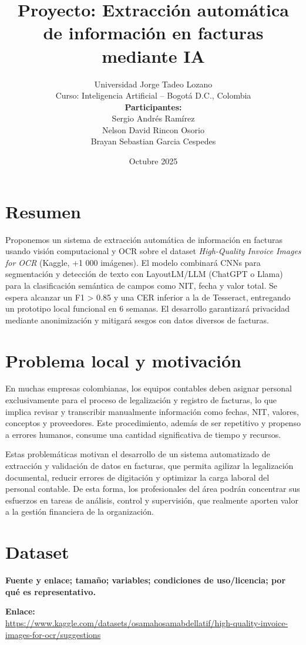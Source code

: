 \documentclass[11pt,letterpaper]{article}
\title{Proyecto: Extracción automática de información en facturas mediante IA}
\author{
	Universidad Jorge Tadeo Lozano \\ 
	Curso: Inteligencia Artificial -- Bogotá D.C., Colombia \\
	\vspace{0.5em}
	\textbf{Participantes:} \\ 
	Sergio Andrés Ramírez \\ 
Nelson David Rincon Osorio \\ 
Brayan Sebastian Garcia Cespedes
}
\date{Octubre 2025}
\begin{document}
	\maketitle
	
	\section{Resumen}
	Proponemos un sistema de extracción automática de información en facturas usando visión computacional y OCR sobre el dataset \textit{High-Quality Invoice Images for OCR} (Kaggle, +1 000 imágenes). El modelo combinará CNNs para segmentación y detección de texto con LayoutLM/LLM (ChatGPT o Llama) para la clasificación semántica de campos como NIT, fecha y valor total. Se espera alcanzar un F1 > 0.85 y una CER inferior a la de Tesseract, entregando un prototipo local funcional en 6 semanas. El desarrollo garantizará privacidad mediante anonimización y mitigará sesgos con datos diversos de facturas.
	
	\section{Problema local y motivación}
	En muchas empresas colombianas, los equipos contables deben asignar personal exclusivamente para el proceso de legalización y registro de facturas, lo que implica revisar y transcribir manualmente información como fechas, NIT, valores, conceptos y proveedores. Este procedimiento, además de ser repetitivo y propenso a errores humanos, consume una cantidad significativa de tiempo y recursos.
	
	Estas problemáticas motivan el desarrollo de un sistema automatizado de extracción y validación de datos en facturas, que permita agilizar la legalización documental, reducir errores de digitación y optimizar la carga laboral del personal contable. De esta forma, los profesionales del área podrán concentrar sus esfuerzos en tareas de análisis, control y supervisión, que realmente aporten valor a la gestión financiera de la organización.
	
	\section{Dataset}
	\textbf{Fuente y enlace; tamaño; variables; condiciones de uso/licencia; por qué es representativo.}
	
	\textbf{Enlace:} \\
	\url{https://www.kaggle.com/datasets/osamahosamabdellatif/high-quality-invoice-images-for-ocr/suggestions}
	
\end{document}

